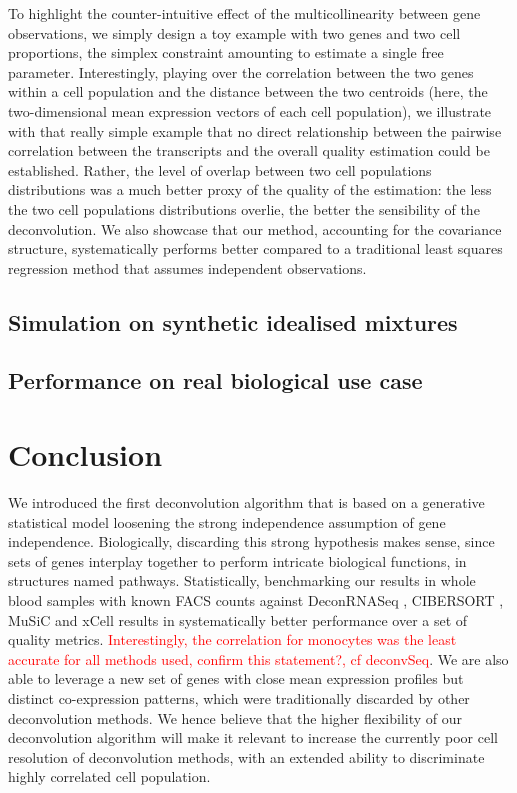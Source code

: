 \documentclass[long, final]{jobim}
\begin{document}
To highlight the counter-intuitive effect of the multicollinearity between gene observations, we simply design a toy example with two genes and two cell proportions, the simplex constraint amounting to estimate a single free parameter. Interestingly, playing over the correlation between the two genes within a cell population and the distance between the two centroids (here, the two-dimensional mean expression vectors of each cell population), we illustrate with that really simple example that no direct relationship between the pairwise correlation between the transcripts and the overall quality estimation could be established. Rather, the level of overlap between two cell populations distributions was a much better proxy of the quality of the estimation: the less the two cell populations distributions overlie, the better the sensibility of the deconvolution. We also showcase that our method, accounting for the covariance structure, systematically performs better compared to a traditional least squares regression method that assumes independent observations. 

\subsection{Simulation on synthetic idealised mixtures}
\label{subsec:sim-idealised}

\subsection{Performance on real biological use case}
\label{subsec:sim-real}



\section{Conclusion}
\label{sec:conclusion}
We introduced the first deconvolution algorithm that is based on a generative statistical model loosening the strong independence assumption of gene independence. Biologically, discarding this strong hypothesis makes sense, since sets of genes interplay together to perform intricate biological functions, in structures named pathways. 
Statistically, benchmarking our results in whole blood samples with known FACS counts against DeconRNASeq \cite{gong_szustakowski13}, CIBERSORT \cite{newman_etal15}, MuSiC \cite{wang_etal19} and xCell \cite{aran_etal17} results in systematically better performance over a set of quality metrics. \textcolor{red}{Interestingly, the correlation for monocytes was the least accurate for all methods used, confirm this statement?, cf deconvSeq}. We are also able to leverage a new set of genes with close mean expression profiles but distinct co-expression patterns, which were traditionally discarded by other deconvolution methods. We hence believe that the higher flexibility of our deconvolution algorithm will make it relevant to increase the currently poor cell resolution of deconvolution methods, with an extended ability to discriminate highly correlated cell population.  
\end{document}
